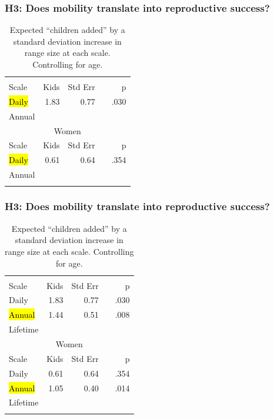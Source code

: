 \documentclass{beamer}
\makeatletter
\newcommand\SoulColor{%
  \let\set@color\beamerorig@set@color
  \let\reset@color\beamerorig@reset@color}
\makeatother
\begin{document}
\begin{frame}
\frametitle{H3: Does mobility translate into reproductive success?}
\begin{table}
\begin{tabular}{lrrrr}
\hline\noalign{\smallskip}
\multicolumn{5}{c}{Men} \\
Scale & Kids & Std Err && p \\
\SoulColor\hl{Daily} & 1.83 & 0.77 && .030 \\
Annual &  &  && \\
\multicolumn{5}{c}{Women} \\
Scale & Kids & Std Err && p \\
\SoulColor\hl{Daily} & 0.61 & 0.64 && .354 \\
Annual & & && \\
\noalign{\smallskip}\hline
\end{tabular}\par
\caption{\small{Expected ``children added'' by a standard deviation increase in range size at each scale. Controlling for age.}}
\end{table}		  

\end{frame}


\begin{frame}
\frametitle{H3: Does mobility translate into reproductive success?}
\begin{table}
\begin{tabular}{lrrrr}
\hline\noalign{\smallskip}
\multicolumn{5}{c}{Men} \\
Scale & Kids & Std Err && p \\
Daily & 1.83 & 0.77 && .030\\
\SoulColor\hl{Annual} & 1.44 & 0.51 && .008\\
Lifetime &  &  &&\\
\multicolumn{5}{c}{Women} \\
Scale & Kids & Std Err && p \\
Daily & 0.61 & 0.64 && .354 \\
\SoulColor\hl{Annual} & 1.05 & 0.40 && .014 \\
Lifetime &  &  && \\
\noalign{\smallskip}\hline
\end{tabular}\par
\caption{\small{Expected ``children added'' by a standard deviation increase in range size at each scale. Controlling for age.}}
\end{table}		  

\end{frame}
\end{document}
